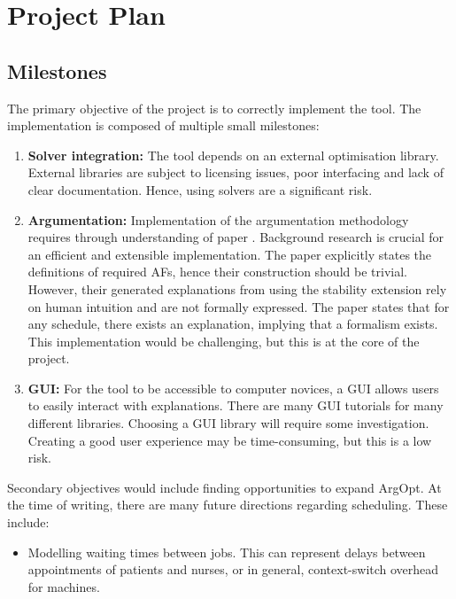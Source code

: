 \chapter{Project Plan}

\section{Milestones}

The primary objective of the project is to correctly implement the tool. The implementation is composed of multiple small milestones:

\begin{enumerate}
	\item\textbf{Solver integration:} The tool depends on an external optimisation library. External libraries are subject to licensing issues, poor interfacing and lack of clear documentation. Hence, using solvers are a significant risk.
	\item\textbf{Argumentation:} Implementation of the argumentation methodology requires through understanding of paper \cite{aes}. Background research is crucial for an efficient and extensible implementation. The paper explicitly states the definitions of required AFs, hence their construction should be trivial. However, their generated explanations from using the stability extension rely on human intuition and are not formally expressed. The paper states that for any schedule, there exists an explanation, implying that a formalism exists. This implementation would be challenging, but this is at the core of the project.
	\item\textbf{GUI:} For the tool to be accessible to computer novices, a GUI allows users to easily interact with explanations. There are many GUI tutorials for many different libraries. Choosing a GUI library will require some investigation. Creating a good user experience may be time-consuming, but this is a low risk.
\end{enumerate}

Secondary objectives would include finding opportunities to expand ArgOpt. At the time of writing, there are many future directions regarding scheduling. These include:
\begin{itemize}
	\item Modelling waiting times between jobs. This can represent delays between appointments of patients and nurses, or in general, context-switch overhead for machines.
\end{itemize}